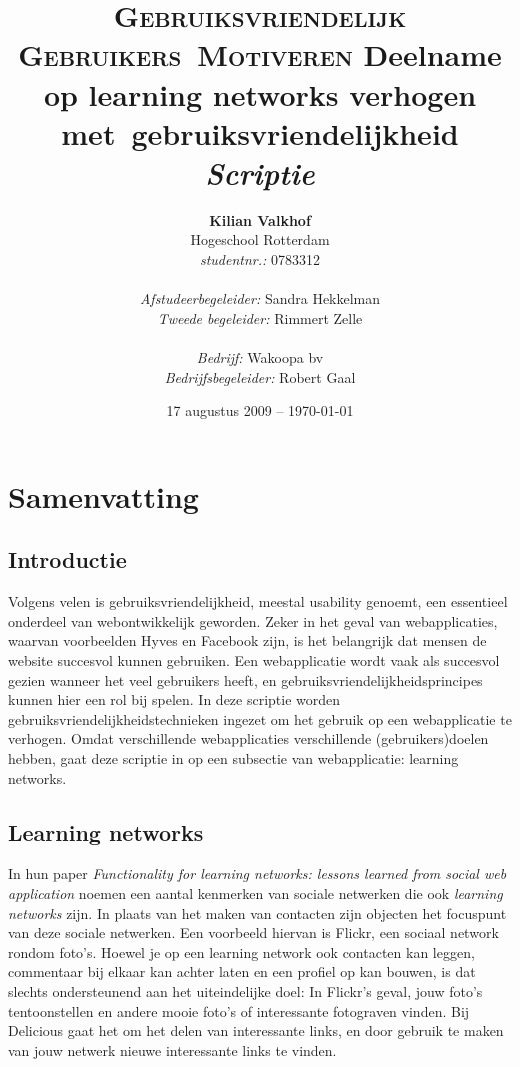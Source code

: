 \documentclass[a4paper, 10pt, pdftex]{report}
\title{\textsc{Gebruiksvriendelijk Gebruikers~Motiveren}
  \linebreak Deelname op learning networks verhogen met~gebruiksvriendelijkheid \linebreak \linebreak \emph{Scriptie}}
\author{\textbf{Kilian Valkhof}\\
  Hogeschool Rotterdam\\
  \textit{studentnr.:} 0783312\\
  \\
  \textit{Afstudeerbegeleider:} Sandra Hekkelman\\
  \textit{Tweede begeleider:} Rimmert Zelle\\
  \\
  \textit{Bedrijf:} Wakoopa bv\\
  \textit{Bedrijfsbegeleider:} Robert Gaal}
\date{17 augustus 2009 -- \today}
\begin{document}
  \normalem
  \maketitle

  \newpage
  \chapter*{Samenvatting}

  \newpage
  \tableofcontents

  \newpage
  \section*{Introductie}
    Volgens velen is gebruiksvriendelijkheid, meestal usability genoemt, een essentieel onderdeel van webontwikkelijk geworden. Zeker in het geval van webapplicaties, waarvan voorbeelden Hyves en Facebook zijn, is het belangrijk dat mensen de website succesvol kunnen gebruiken. Een webapplicatie wordt vaak als succesvol gezien wanneer het veel gebruikers heeft, en gebruiksvriendelijkheidsprincipes kunnen hier een rol bij spelen. In deze scriptie worden gebruiksvriendelijkheidstechnieken ingezet om het gebruik op een webapplicatie te verhogen. Omdat verschillende webapplicaties verschillende (gebruikers)doelen hebben, gaat deze scriptie in op een subsectie van webapplicatie: learning networks.

    \section{Learning networks}
            In hun paper \emph{Functionality for learning networks: lessons learned from social web application} noemen \citeauthor{Berlanga2007} een aantal kenmerken van sociale netwerken die ook \emph{learning networks} zijn. In plaats van het maken van contacten zijn objecten het focuspunt van deze sociale netwerken. Een voorbeeld hiervan is Flickr, een sociaal network rondom foto's. Hoewel je op een learning network ook contacten kan leggen, commentaar bij elkaar kan achter laten en een profiel op kan bouwen, is dat slechts ondersteunend aan het uiteindelijke doel: In Flickr's geval, jouw foto's tentoonstellen en andere mooie foto's of interessante fotograven vinden. Bij Delicious gaat het om het delen van interessante links, en door gebruik te maken van jouw netwerk nieuwe interessante links te vinden.
\end{document}
